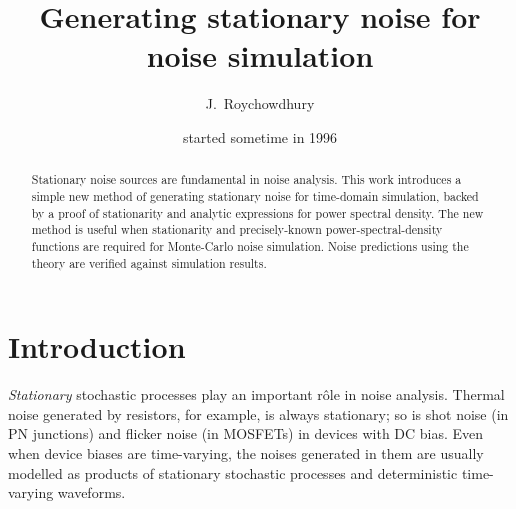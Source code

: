 \documentclass[9pt,times]{article}
\begin{document}
\title{Generating stationary noise for noise simulation}
\author{J.~Roychowdhury}
\date{started sometime in 1996}

\maketitle

\begin{abstract}
Stationary noise sources are fundamental in noise analysis.
This work introduces a simple new method of generating
stationary noise for time-domain simulation, backed by a proof of
stationarity and analytic expressions for power spectral density.  The new
method is useful when stationarity and precisely-known
power-spectral-density functions are required for Monte-Carlo noise
simulation. Noise predictions using the theory are verified against
simulation results.
\end{abstract}

\section{Introduction}
\label{sec:intro}

{\em Stationary} stochastic processes play an important r\^ole in
noise analysis. Thermal noise generated by resistors, for example, is always
stationary; so is shot noise (in PN junctions) and flicker noise (in
MOSFETs) in devices with DC bias. Even when device biases are time-varying,
the noises generated in them are usually modelled as products of stationary
stochastic processes and deterministic time-varying waveforms\cite{reference}.

%
\end{document}

